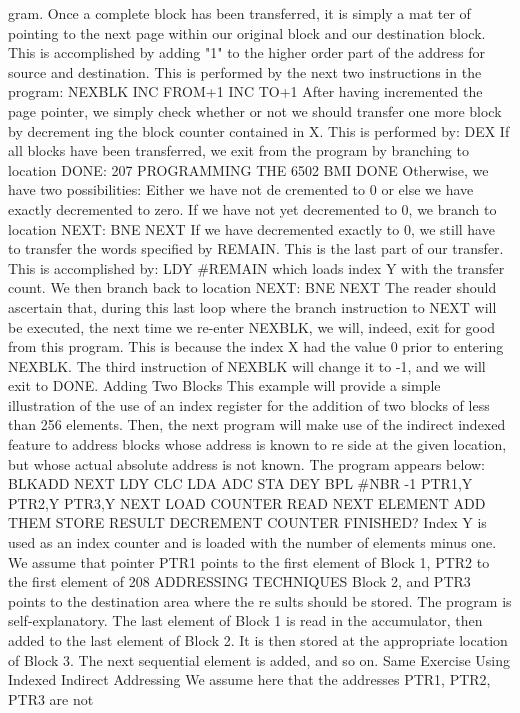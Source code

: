 gram.
Once a complete block has been transferred, it is simply a mat
ter of pointing to the next page within our original block and our
destination block. This is accomplished by adding "1" to the
higher order part of the address for source and destination. This is
performed by the next two instructions in the program:
NEXBLK INC FROM+1
INC TO+1
After having incremented the page pointer, we simply check
whether or not we should transfer one more block by decrement
ing the block counter contained in X. This is performed by:
DEX
If all blocks have been transferred, we exit from the program by
branching to location DONE:
207
PROGRAMMING THE 6502
BMI DONE
Otherwise, we have two possibilities: Either we have not de
cremented to 0 or else we have exactly decremented to zero. If we
have not yet decremented to 0, we branch to location NEXT:
BNE NEXT
If we have decremented exactly to 0, we still have to transfer
the words specified by REMAIN. This is the last part of our
transfer. This is accomplished by:
LDY #REMAIN
which loads index Y with the transfer count.
We then branch back to location NEXT:
BNE NEXT
The reader should ascertain that, during this last loop where
the branch instruction to NEXT will be executed, the next time
we re-enter NEXBLK, we will, indeed, exit for good from this
program. This is because the index X had the value 0 prior to
entering NEXBLK. The third instruction of NEXBLK will
change it to -1, and we will exit to DONE.
Adding Two Blocks
This example will provide a simple illustration of the use of an
index register for the addition of two blocks of less than 256
elements. Then, the next program will make use of the indirect
indexed feature to address blocks whose address is known to re
side at the given location, but whose actual absolute address is
not known. The program appears below:
BLKADD
NEXT
LDY
CLC
LDA
ADC
STA
DEY
BPL
#NBR -1
PTR1,Y
PTR2,Y
PTR3,Y
NEXT
LOAD COUNTER
READ NEXT ELEMENT
ADD THEM
STORE RESULT
DECREMENT COUNTER
FINISHED?
Index Y is used as an index counter and is loaded with the
number of elements minus one. We assume that pointer PTR1
points to the first element of Block 1, PTR2 to the first element of
208
ADDRESSING TECHNIQUES
Block 2, and PTR3 points to the destination area where the re
sults should be stored.
The program is self-explanatory. The last element of Block 1 is
read in the accumulator, then added to the last element of Block
2. It is then stored at the appropriate location of Block 3. The next
sequential element is added, and so on.
Same Exercise Using Indexed Indirect Addressing
We assume here that the addresses PTR1, PTR2, PTR3 are not
